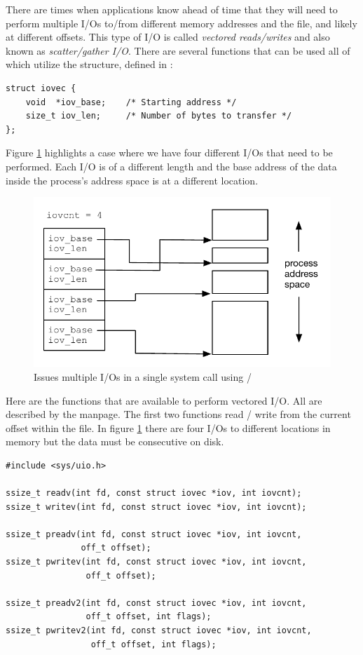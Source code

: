 There are times when applications know ahead of time that they will need to perform multiple I/Os to/from different memory addresses and the file, and likely at different offsets. This type of I/O is called \textit{vectored reads/writes} and also known as \textit{scatter/gather I/O}. There are several functions that can be used all of which utilize the  structure, defined in :

\begin{lstlisting}
struct iovec {
    void  *iov_base;    /* Starting address */
    size_t iov_len;     /* Number of bytes to transfer */
};
\end{lstlisting}

\noindent
Figure \ref{fig:readv} highlights a case where we have four different I/Os that need to be performed. Each I/O is of a different length and the base address of the data inside the process's address space is at a different location. 

\begin{figure}
	\includegraphics[scale=0.6]{figures/readv.pdf}
	\centering
	\caption{Issues multiple I/Os in a single system call using  / }
	\label{fig:readv}
\end{figure}

Here are the functions that are available to perform vectored I/O. All are described by the  manpage. The first two functions read / write from the current offset within the file. In figure \ref{fig:readv} there are four I/Os to different locations in memory but the data must be consecutive on disk.

\begin{lstlisting}
#include <sys/uio.h>

ssize_t readv(int fd, const struct iovec *iov, int iovcnt);
ssize_t writev(int fd, const struct iovec *iov, int iovcnt);

ssize_t preadv(int fd, const struct iovec *iov, int iovcnt,
               off_t offset);
ssize_t pwritev(int fd, const struct iovec *iov, int iovcnt,
                off_t offset);

ssize_t preadv2(int fd, const struct iovec *iov, int iovcnt,
                off_t offset, int flags);
ssize_t pwritev2(int fd, const struct iovec *iov, int iovcnt,
                 off_t offset, int flags);
\end{lstlisting}

